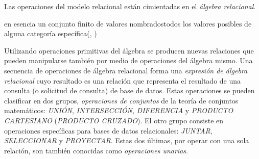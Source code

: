 Las operaciones del modelo relacional están cimientadas en el \emph{álgebra relacional}.

\begin{displayquote}
	en esencia un conjunto finito de valores nombrados\textemdash todos los valores posibles de alguna categoría específica(\citeauthor{date12}, \citeyear{date12})
\end{displayquote}

Utilizando operaciones primitivas del álgebra se producen nuevas relaciones que pueden manipularse también por medio de operaciones del álgebra mismo. Una secuencia de operaciones de álgebra relacional forma una \emph{expresión de álgebra relacional} cuyo resultado es una relación que representa el resultado de una consulta (o solicitud de consulta) de base de datos. Estas operaciones se pueden clasificar en dos grupos, \emph{operaciones de conjuntos} de la teoría de conjuntos matemáticos: \emph{UNIÓN}, \emph{INTERSECCIÓN}, \emph{DIFERENCIA} y \emph{PRODUCTO CARTESIANO} (\emph{PRODUCTO CRUZADO}). El otro grupo consiste en operaciones específicas para bases de datos relacionales: \emph{JUNTAR}, \emph{SELECCIONAR} y \emph{PROYECTAR}. Estas dos últimas, por operar con una sola relación, son también conocidas como \emph{operaciones unarias}.

